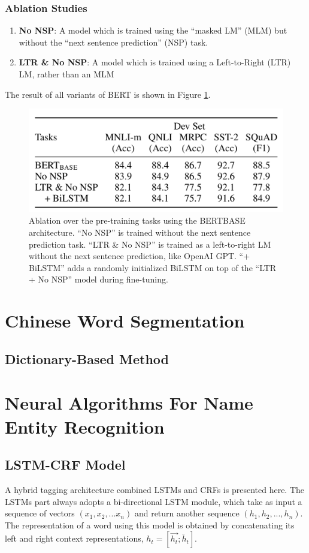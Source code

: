 \documentclass[a3paper, 12pt]{book} %
\begin{document}
\subsection{Ablation Studies}
\begin{enumerate}
	\item \textbf{No NSP}: A model which is trained using the “masked LM” (MLM) but without the “next sentence prediction” (NSP) task.
	\item \textbf{LTR \& No NSP}: A model which is trained using a Left-to-Right (LTR) LM, rather than an MLM
\end{enumerate}
The result of all variants of BERT is shown in Figure \ref{fig:bert_ablation_study}.
\begin{figure}[htpb]
	\centering
	\includegraphics[width=\linewidth]{figures/bert_ablation_study.png}
	\caption{Ablation over the pre-training tasks using the BERTBASE architecture. “No NSP” is trained without the next sentence prediction task. “LTR \& No NSP” is trained as a left-to-right LM without the next sentence prediction, like OpenAI GPT. “+ BiLSTM” adds a randomly initialized BiLSTM on top of the “LTR + No NSP” model during fine-tuning.}
	\label{fig:bert_ablation_study}
\end{figure}


\chapter{Chinese Word Segmentation}
\section{Dictionary-Based Method}

\chapter{Neural Algorithms For Name Entity Recognition}
\section{LSTM-CRF Model}
A hybrid tagging architecture combined LSTMs and CRFs is presented here. The LSTMs part always adopts a bi-directional LSTM module, which take as input a sequence of vectors $(x_1, x_2,...x_n)$ and return another sequence $(h_1,h_2,...,h_n)$. The representation of a word using this model is obtained by concatenating its left and right context representations, $h_t=[\overrightarrow{h_t};\overleftarrow{h_t}]$.
\end{document}
